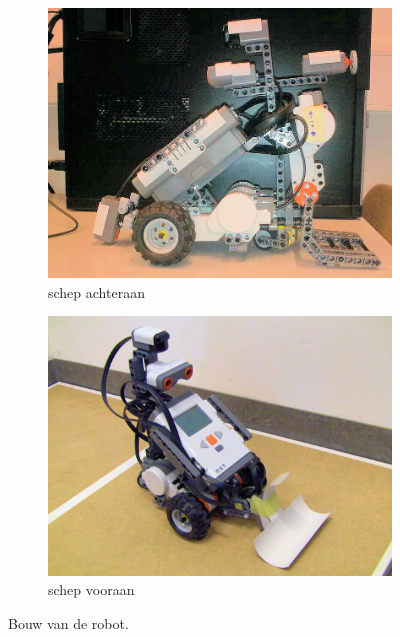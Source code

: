 \documentclass[tt2]{penoverslag}
\begin{document}
\begin{figure}
\centering
	\begin{subfigure}[h]{0.45\textwidth}
	\centering
		\includegraphics[width=\textwidth]{robotSchepOud}
		\caption{schep achteraan}
		\label{fig:robotBouwAchter}
	\end{subfigure}%
	\begin{subfigure}[h]{0.47\textwidth}
		\centering
		\includegraphics[width=\textwidth]{robotSchepNieuw}
	\caption{schep vooraan}
	\label{fig:robotBouwVoor}
\end{subfigure}
\caption{Bouw van de robot.}
\label{fig:robotBouw}
\end{figure}
\end{document}
